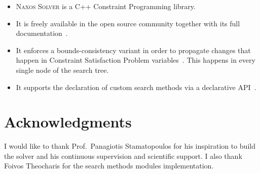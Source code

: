 \documentclass[a4paper]{article}
\begin{document}
\title{}

\author{Nikolaos Pothitos}


\date{}

\maketitle

\begin{itemize}
  \item \textsc{Naxos Solver} is a C++ Constraint
        Programming library.
  \item It is freely available in the open source community
        together with its full documentation~\cite{Naxos}.
  \item It enforces a bounds-consistency variant in order to
        propagate changes that happen in Constraint
        Satisfaction Problem variables~\cite{TODO}. This
        happens in every single node of the search tree.
  \item It supports the declaration of custom search methods
        via a declarative API~\cite{Pothitos2017}.
\end{itemize}

\section*{Acknowledgments}

I would like to thank Prof.~Panagiotis Stamatopoulos for his
inspiration to build the solver and his continuous
supervision and scientific support. I also thank Foivos
Theocharis for the search methods modules implementation.

\nocite{*}


\end{document}
